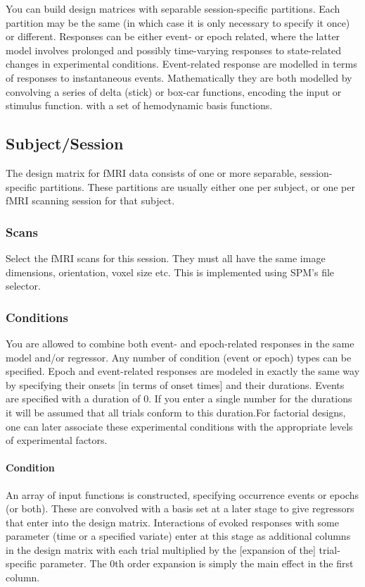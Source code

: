 \documentclass[a4paper,titlepage]{book}
\begin{document}
You can build design matrices with separable session-specific partitions.  Each partition may be the same (in which case it is only necessary to specify it once) or different.  Responses can be either event- or epoch related, where the latter model involves prolonged and possibly time-varying responses to state-related changes in experimental conditions.  Event-related response are modelled in terms of responses to instantaneous events.  Mathematically they are both modelled by convolving a series of delta (stick) or box-car functions, encoding the input or stimulus function. with a set of hemodynamic basis functions.


\subsection{Subject/Session}
The design matrix for fMRI data consists of one or more separable, session-specific partitions.  These partitions are usually either one per subject, or one per fMRI scanning session for that subject.


\subsubsection{Scans}
Select the fMRI scans for this session.  They must all have the same image dimensions, orientation, voxel size etc. This is implemented 
using SPM's file selector.


\subsubsection{Conditions}
You are allowed to combine both event- and epoch-related responses in the same model and/or regressor. Any number of condition (event or epoch) types can be specified.  Epoch and event-related responses are modeled in exactly the same way by specifying their onsets [in terms of onset times] and their durations.  Events are specified with a duration of 0.  If you enter a single number for the durations it will be assumed that all trials conform to this duration.For factorial designs, one can later associate these experimental conditions with the appropriate levels of experimental factors. 


\paragraph{Condition}
An array of input functions is constructed, specifying occurrence events or epochs (or both). These are convolved with a basis set at a later stage to give regressors that enter into the design matrix. Interactions of evoked responses with some parameter (time or a specified variate) enter at this stage as additional columns in the design matrix with each trial multiplied by the [expansion of the] trial-specific parameter. The 0th order expansion is simply the main effect in the first column.
\end{document}
